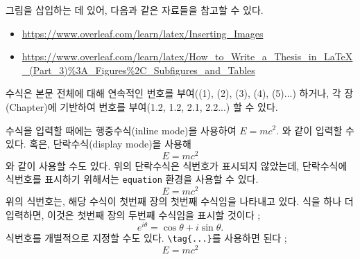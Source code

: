 \documentclass{report}
\begin{document}
그림을 삽입하는 데 있어, 다음과 같은 자료들을 참고할 수 있다.
\begin{itemize}
\item
\url{https://www.overleaf.com/learn/latex/Inserting_Images}
\item
\url{https://www.overleaf.com/learn/latex/How_to_Write_a_Thesis_in_LaTeX_(Part_3)%3A_Figures%2C_Subfigures_and_Tables}
\end{itemize}

수식은 본문 전체에 대해 연속적인 번호를 부여((1), (2), (3), (4), (5)...) 하거나, 각 장(Chapter)에 기반하여 번호를 부여(1.2, 1.2, 2.1, 2.2...) 할 수 있다.

수식을 입력할 때에는 행중수식(inline mode)을 사용하여 \(E=mc^2\). %
와 같이 입력할 수 있다.
혹은, 단락수식(display mode)을 사용해
\[E=mc^2\]
와 같이 사용할 수도 있다.
위의 단락수식은 식번호가 표시되지 않았는데, 단락수식에 식번호를 표시하기 위해서는 \texttt{equation} 환경을 사용할 수 있다.
\begin{equation}
E=mc^2
\end{equation}
위의 식번호는, 해당 수식이 첫번째 장의 첫번째 수식임을 나타내고 있다.
식을 하나 더 입력하면, 이것은 첫번째 장의 두번째 수식임을 표시할 것이다 ;
\begin{equation}
e^{i\theta}=\cos\theta+i\sin\theta.
\end{equation}
식번호를 개별적으로 지정할 수도 있다.
\verb|\tag{...}|를 사용하면 된다 ;
\[E=mc^2\tag{$*$}\]
\end{document}
